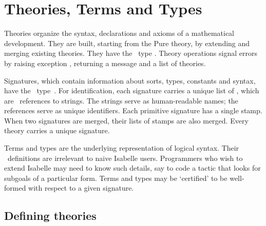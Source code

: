 
\chapter{Theories, Terms and Types} \label{theories}
Theories organize the syntax, declarations and axioms of a mathematical
development.  They are built, starting from the Pure theory, by extending
and merging existing theories.  They have the \ML\ type .
Theory operations signal errors by raising exception ,
returning a message and a list of theories.

Signatures, which contain information about sorts, types, constants and
syntax, have the \ML\ type~.  For identification, each
signature carries a unique list of , which are \ML\ 
references to strings.  The strings serve as human-readable names; the
references serve as unique identifiers.  Each primitive signature has a
single stamp.  When two signatures are merged, their lists of stamps are
also merged.  Every theory carries a unique signature.

Terms and types are the underlying representation of logical syntax.  Their
\ML\ definitions are irrelevant to naive Isabelle users.  Programmers who
wish to extend Isabelle may need to know such details, say to code a tactic
that looks for subgoals of a particular form.  Terms and types may be
`certified' to be well-formed with respect to a given signature.


\section{Defining theories}\label{sec:ref-defining-theories}

